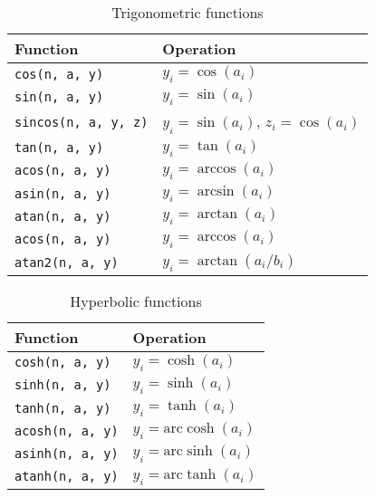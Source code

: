\begin{table}
  \begin{tabularx}{\textwidth}{LL}
    \toprule
    Function & Operation \\
    \midrule
    \verb|cos(n, a, y)|       & $y_i = \cos(a_i)$                    \\
    \verb|sin(n, a, y)|       & $y_i = \sin(a_i)$                    \\
    \verb|sincos(n, a, y, z)| & $y_i = \sin(a_i)$, $z_i = \cos(a_i)$ \\
    \verb|tan(n, a, y)|       & $y_i = \tan(a_i)$                    \\
    \verb|acos(n, a, y)|      & $y_i = \arccos(a_i)$                 \\
    \verb|asin(n, a, y)|      & $y_i = \arcsin(a_i)$                 \\
    \verb|atan(n, a, y)|      & $y_i = \arctan(a_i)$                 \\
    \verb|acos(n, a, y)|      & $y_i = \arccos(a_i)$                 \\
    \verb|atan2(n, a, y)|     & $y_i = \arctan(a_i / b_i)$           \\
    \bottomrule
  \end{tabularx}
  \caption{Trigonometric functions}
  \label{tab:Trigonometric functions}
\end{table}

\begin{table}
  \begin{tabularx}{\textwidth}{LL}
    \toprule
    Function & Operation \\
    \midrule
    \verb|cosh(n, a, y)|  & $y_i = \cosh(a_i)$             \\
    \verb|sinh(n, a, y)|  & $y_i = \sinh(a_i)$             \\
    \verb|tanh(n, a, y)|  & $y_i = \tanh(a_i)$             \\
    \verb|acosh(n, a, y)| & $y_i = \mathrm{arc}\cosh(a_i)$ \\
    \verb|asinh(n, a, y)| & $y_i = \mathrm{arc}\sinh(a_i)$ \\
    \verb|atanh(n, a, y)| & $y_i = \mathrm{arc}\tanh(a_i)$ \\
    \bottomrule
  \end{tabularx}
  \caption{Hyperbolic functions}
  \label{tab:Hyperbolic functions}
\end{table}

